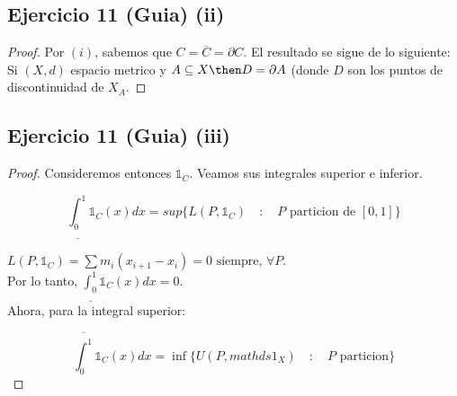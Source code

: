 \documentclass[a4paper]{report}
\begin{document}
\subsection{Ejercicio 11 (Guia) (ii)}  

\begin{proof}
	Por $(i)$, sabemos que $C=\overline{C}=\partial C$. El resultado se sigue de lo siguiente: Si $(X,d)$ espacio metrico y $A\subseteq X \then D = \partial A$ (donde $D$ son los puntos de discontinuidad de $X_A$.

\end{proof}

\subsection{Ejercicio 11 (Guia) (iii)}  

\begin{proof}
	Consideremos entonces $\mathds{1}_C$. Veamos sus integrales superior e inferior.

	\[
	\underline{\int_{0}^{1}} \mathds{1}_C(x) dx = sup \{L(P,\mathds{1}_C) \quad : \quad P \text{ particion de } [0,1] \}
	\]

	$L(P,\mathds{1}_C) = \sum m_i (x_{i+1}-x_i)=0 \text{ siempre, } \forall P$.\\

	Por lo tanto, $\underline{\int_{0}^{1}} \mathds{1}_C (x) dx =0 $.\\

	Ahora, para la integral superior:

	\[
	\overline{\int_{0}^{1}} \mathds{1}_C (x) dx = \inf \{U(P,mathds{1}_X) \quad : \quad P \text{ particion} \}
	\]
\end{proof}
\end{document}
